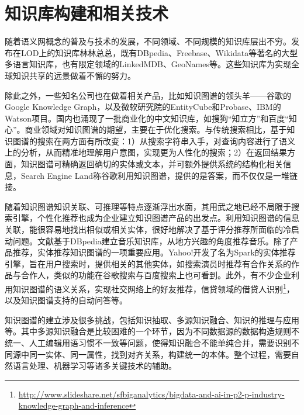 \section{知识库构建和相关技术}
\label{sec:knowledgebase-research}

随着语义网概念的普及与技术的发展，不同领域、不同规模的知识库层出不穷。发布在LOD上的知识库林林总总，既有DBpedia、Freebase、Wikidata等著名的大型多语言知识库，也有限定领域的LinkedMDB\cite{erxleben2014introducing}、GeoNames\cite{wick2011geonames}等。这些知识库为实现全球知识共享的远景做着不懈的努力。

除此之外，一些知名公司也在做着相关产品，比如知识图谱的领头羊——谷歌的Google Knowledge Graph\cite{singhal2012introducing}，以及微软研究院的EntityCube\cite{nie2012statistical}和Probase\cite{wu2012probase}、IBM的Watson项目\cite{ferrucci2012introduction}。国内也涌现了一批商业化的中文知识库，如搜狗“知立方”和百度“知心”。商业领域对知识图谱的期望，主要在于优化搜索。与传统搜索相比，基于知识图谱的搜索在两方面有所改变：1）从搜索字符串入手，对查询内容进行了语义上的分析，从而精准地理解用户意图，实现更为人性化的搜索；2）在返回结果方面，知识图谱可精确返回确切的实体或文本，并可额外提供系统的结构化相关信息，Search Engine Land称谷歌利用知识图谱，提供的是答案，而不仅仅是一堆链接\cite{sullivan2012google}。

随着知识图谱知识关联、可推理等特点逐渐浮出水面，其用武之地已经不局限于搜索引擎，个性化推荐也成为企业建立知识图谱产品的出发点\cite{Burke00knowledge-basedrecommender,aggarwal2016knowledge}。利用知识图谱的信息关联，能很容易地找出相似或相关实体，很好地解决了基于评分推荐所面临的冷启动问题。文献\cite{passant2010dbrec,kaminskas2012knowledge}基于DBpedia建立音乐知识库，从地方兴趣的角度推荐音乐。除了产品推荐，实体推荐知识图谱的一项重要应用。Yahoo!开发了名为Spark的实体推荐引擎\cite{blanco2013entity}，旨在用户搜索时，提供相关的其他实体，如搜索演员时推荐有合作关系的作品与合作人，类似的功能在谷歌搜索与百度搜索上也可看到。此外，有不少企业利用知识图谱的语义关系，实现社交网络上的好友推荐\cite{venkataramani2012tao}，信贷领域的借贷人识别\footnote{\url{http://www.slideshare.net/sfbiganalytics/bigdata-and-ai-in-p2-p-industry-knowledge-graph-and-inference}}，以及知识图谱支持的自动问答等\cite{yih2015semantic,yang2014joint}。

知识图谱的建立涉及很多挑战，包括知识抽取、多源知识融合、知识的推理与应用等。其中多源知识融合是比较困难的一个环节，因为不同数据源的数据构造规则不统一、人工编辑用语习惯不一致等问题，使得知识融合不能单纯合并，需要识别不同源中同一实体、同一属性，找到对齐关系，构建统一的本体。整个过程，需要自然语言处理、机器学习等诸多关键技术的辅助。

